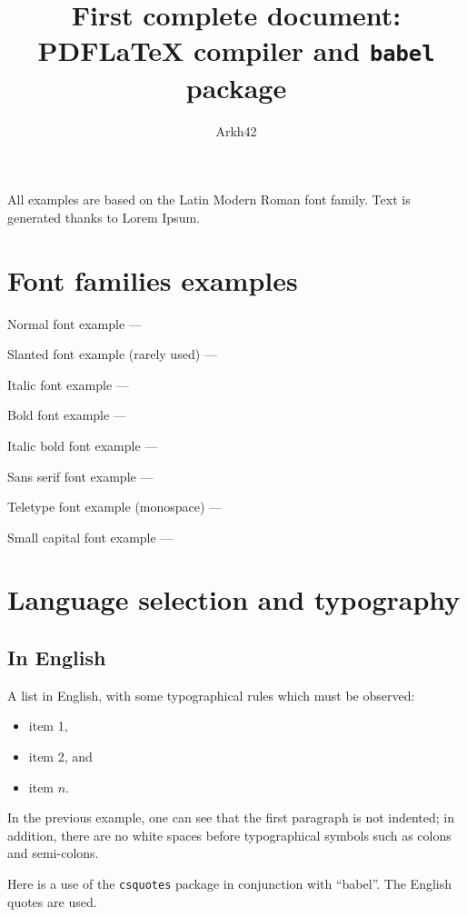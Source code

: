 \documentclass[11pt, a4paper, english]{article}
\author{Arkh42}
\title{First complete document: PDF\LaTeX{} compiler and \texttt{babel} package}
\begin{document}
	
	
	\maketitle
	
	
	All examples are based on the Latin Modern Roman font family.
	Text is generated thanks to Lorem Ipsum.
	
	
	\section{Font families examples}
	
		Normal font example --- \lipsum[1]
		
		Slanted font example (rarely used) --- \textsl{\lipsum[1]}
		
		Italic font example --- \textit{\lipsum[1]}
		
		Bold font example --- \textbf{\lipsum[1]}
		
		Italic bold font example --- \textbf{\textit{\lipsum[1]}}
		
		Sans serif font example --- \textsf{\lipsum[1]}
		
		Teletype font example (monospace) --- \texttt{\lipsum[1]}
		
		Small capital font example --- \textsc{\lipsum[1]}
	
	
	\section{Language selection and typography}
	
	
		\subsection{In English}
		
			A list in English, with some typographical rules which must be observed:
			\begin{itemize}
				\item item 1,
				\item item 2, and
				\item item $n$.
			\end{itemize}
			
			In the previous example, one can see that the first paragraph is not indented; in addition, there are no white spaces before typographical symbols such as colons and semi-colons.
			
			Here is a use of the \texttt{csquotes} package in conjunction with \enquote{babel}. The English quotes are used. 
	
\end{document}
